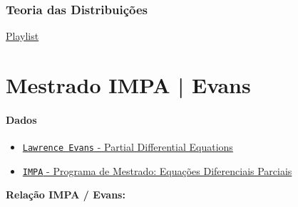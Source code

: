 \documentclass[11pt]{article}
\begin{document}
\section{Teoria das Distribuições}

\href{https://www.youtube.com/playlist?list=PLBh2i93oe2qsbptdcvFlowCl51EX_a3nB}{Playlist}







































\pagebreak
\part{Mestrado IMPA | Evans}

\subsection*{Dados}

\begin{itemize}
	\item \href{https://drive.google.com/file/d/1bOlWX21qnyxnmdRSzDxEXiJgdZ38O2zZ/view?usp=sharing}{\texttt{Lawrence Evans} - Partial Differential Equations}
	\item \href{https://www.youtube.com/playlist?list=PLo4jXE-LdDTQZiRS7tEx-5hALcQFLthCS}{\texttt{IMPA} - Programa de Mestrado: Equações Diferenciais Parciais}
\end{itemize}

\vspace{8mm}

\textbf{Relação IMPA / Evans:}
\end{document}
